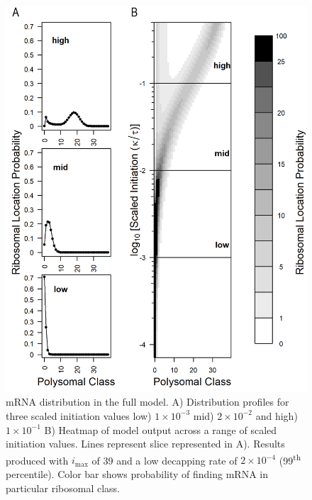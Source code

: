 \documentclass[review]{elsarticle}
\newcommand{\imax}{\ensuremath{{i_{\max}}}\xspace}
\begin{document}
\begin{figure}[!ht]
\centering
\includegraphics[width=120mm]{Images/2023-07-09_Figure1_DIIvsDDI_medianlength_low_marking_with_labels.png}
\caption{mRNA distribution in the full model. A) Distribution profiles for three scaled initiation values low) $1\times 10^{-3}$ mid) $2\times 10^{-2}$ and high) $1\times 10^{-1}$ B) Heatmap of model output across a range of scaled initiation values. Lines represent slice represented in A). Results produced with \imax of 39 and a low decapping rate of $2\times10^{-4}$  (99\textsuperscript{th} percentile). Color bar shows probability of finding mRNA in particular ribosomal class.}
\end{figure}
\clearpage
\end{document}
